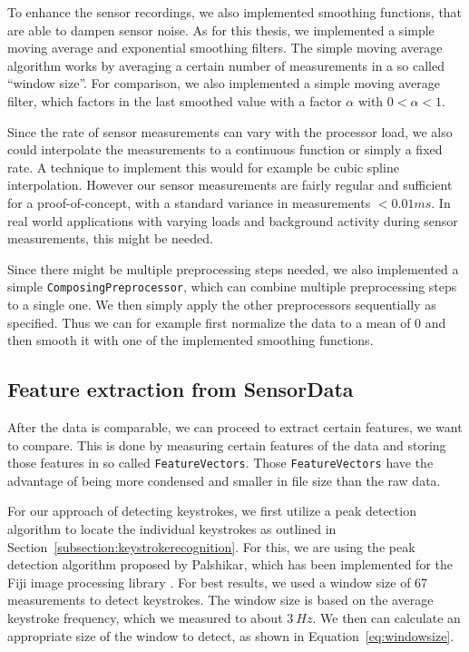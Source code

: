 To enhance the sensor recordings, we also implemented smoothing functions, that are able to dampen sensor noise. As for this thesis, we implemented a simple moving average and exponential smoothing filters. The simple moving average algorithm works by averaging a certain number of measurements in a so called ``window size''. For comparison, we also implemented a simple moving average filter, which factors in the last smoothed value with a factor $\alpha$ with $0 < \alpha < 1$.

Since the rate of sensor measurements can vary with the processor load, we also could interpolate the measurements to a continuous function or simply a fixed rate. A technique to implement this would for example be cubic spline interpolation. However our sensor measurements are fairly regular and sufficient for a proof-of-concept, with a standard variance in measurements $< 0.01ms$. In real world applications with varying loads and background activity during sensor measurements, this might be needed.

Since there might be multiple preprocessing steps needed, we also implemented a simple \lstinline$ComposingPreprocessor$, which can combine multiple preprocessing steps to a single one. We then simply apply the other preprocessors sequentially as specified. Thus we can for example first normalize the data to a mean of 0 and then smooth it with one of the implemented smoothing functions.

\subsection{Feature extraction from SensorData}\label{subsection:featureextraction}
After the data is comparable, we can proceed to extract certain features, we want to compare. This is done by measuring certain features of the data and storing those features in so called \lstinline$FeatureVectors$. Those \lstinline$FeatureVectors$ have the advantage of being more condensed and smaller in file size than the raw data.

For our approach of detecting keystrokes, we first utilize a peak detection algorithm to locate the individual keystrokes as outlined in Section~\ref{subsection:keystrokerecognition}. For this, we are using the peak detection algorithm proposed by Palshikar, which has been implemented for the Fiji image processing library \cite{palshikar2009simple, tinevez2011peak}. For best results, we used a window size of 67 measurements to detect keystrokes. The window size is based on the average keystroke frequency, which we measured to about $\SI{3}{Hz}$. We then can calculate an appropriate size of the window to detect, as shown in Equation~\ref{eq:windowsize}.

